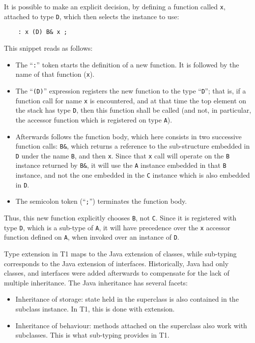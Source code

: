 It is possible to make an explicit decision, by defining a function
called \verb|x|, attached to type \verb|D|, which then selects the
instance to use:
\begin{verbatim}
    : x (D) B& x ;
\end{verbatim}
This snippet reads as follows:
\begin{itemize}

    \item The ``\verb|:|'' token starts the definition of a new function.
    It is followed by the name of that function (\verb|x|).

    \item The ``\verb|(D)|'' expression registers the new function to
    the type ``\verb|D|''; that is, if a function call for name \verb|x|
    is encountered, and at that time the top element on the stack has
    type \verb|D|, then this function shall be called (and not, in
    particular, the accessor function which is registered on type
    \verb|A|).

    \item Afterwards follows the function body, which here consists in two
    successive function calls: \verb|B&|, which returns a reference to the
    sub-structure embedded in \verb|D| under the name \verb|B|, and then
    \verb|x|. Since that \verb|x| call will operate on the \verb|B|
    instance returned by \verb|B&|, it will use the \verb|A| instance
    embedded in that \verb|B| instance, and not the one embedded in the
    \verb|C| instance which is also embedded in \verb|D|.

    \item The semicolon token (``\verb|;|'') terminates the function body.

\end{itemize}
Thus, this new function explicitly chooses \verb|B|, not \verb|C|. Since
it is registered with type \verb|D|, which is a sub-type of \verb|A|, it
will have precedence over the \verb|x| accessor function defined on
\verb|A|, when invoked over an instance of \verb|D|.

\begin{rationale}
Type extension in T1 maps to the Java extension of classes, while
sub-typing corresponds to the Java extension of interfaces. Historically,
Java had only classes, and interfaces were added afterwards to compensate
for the lack of multiple inheritance. The Java inheritance has several
facets:
\begin{itemize}

    \item Inheritance of storage: state held in the superclass is also
    contained in the subclass instance. In T1, this is done with extension.

    \item Inheritance of behaviour: methods attached on the superclass
    also work with subclasses. This is what sub-typing provides in T1.

\end{itemize}
\end{rationale}


